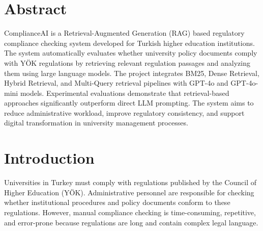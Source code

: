 \documentclass[a4paper,12pt]{article}
\begin{document}
\renewcommand{\arraystretch}{1.2}

\maketitle


\newpage
\section{Abstract}

\hspace{0.5cm} ComplianceAI is a Retrieval-Augmented Generation (RAG) based regulatory compliance checking system developed for Turkish higher education institutions. The system automatically evaluates whether university policy documents comply with YÖK regulations by retrieving relevant regulation passages and analyzing them using large language models. The project integrates BM25, Dense Retrieval, Hybrid Retrieval, and Multi-Query retrieval pipelines with GPT-4o and GPT-4o-mini models. Experimental evaluations demonstrate that retrieval-based approaches significantly outperform direct LLM prompting. The system aims to reduce administrative workload, improve regulatory consistency, and support digital transformation in university management processes.


\newpage
\tableofcontents


\newpage
\section{Introduction}

\hspace{0.5cm} Universities in Turkey must comply with regulations published by the Council of Higher Education (YÖK). Administrative personnel are responsible for checking whether institutional procedures and policy documents conform to these regulations. However, manual compliance checking is time-consuming, repetitive, and error-prone because regulations are long and contain complex legal language.
\end{document}
